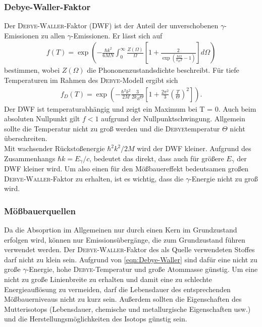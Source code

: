 \documentclass[a4paper,twoside,final]{article}
\begin{document}
\subsubsection{Debye-Waller-Faktor}
Der \textsc{Debye}-\textsc{Waller}-Faktor (DWF) ist der Anteil der unverschobenen $\gamma$-Emissionen zu allen $\gamma$-Emissionen. Er lässt sich auf
\begin{align}
f(T) = \exp\left(-\frac{\hbar k^2}{6MN}\int_{0}^{\infty} \frac{Z(\Omega)}{\Omega}\left[1+\frac{2}{\exp(\frac{\hbar\Omega}{k_B T}-1)}\right] d\Omega\right)
\end{align}
bestimmen, wobei $Z(\Omega)$ die Phononenzustandsdichte beschreibt. Für tiefe Temperaturen im Rahmen des \textsc{Debye}-Modell ergibt sich
\begin{align}\label{eqn:Debye-Waller}
f_D(T) = \exp\left(-\frac{\hbar^2k^2}{2M}\frac{3}{2k_B\Theta}\left[1+\frac{2\pi^2}{3}\left(\frac{T}{\Theta}\right)^2\right]\right).
\end{align}
Der DWF ist temperaturabhängig und zeigt ein Maximum bei T = 0. Auch beim absoluten Nullpunkt gilt $f < 1$ aufgrund der Nullpunktschwingung. Allgemein sollte die Temperatur nicht zu groß werden und die \textsc{Debye}temperatur $\Theta$ nicht überschreiten.\\
Mit wachsender Rückstoßenergie $\hbar^2k^2/2M$ wird der DWF kleiner. Aufgrund des Zusammenhangs $\hbar k = E_\gamma / c $, bedeutet das direkt, dass auch für größere $E_\gamma$ der DWF kleiner wird. Um also einen für den Mößbauereffekt bedeutsamen großen \textsc{Debye}-\textsc{Waller}-Faktor zu erhalten, ist es wichtig, dass die $\gamma$-Energie nicht zu groß wird.

\subsubsection{Mößbauerquellen}
Da die Absoprtion im Allgemeinen nur durch einen Kern im Grundzustand erfolgen wird, können nur Emissionsübergänge, die zum Grundzustand führen verwendet werden. Der \textsc{Debye}-\textsc{Waller}-Faktor des als Quelle verwendeten Stoffes darf nicht zu klein sein. Aufgrund von \eqref{eqn:Debye-Waller} sind dafür eine nicht zu große $\gamma$-Energie, hohe \textsc{Debye}-Temperatur und große Atommasse günstig. Um eine nicht zu große Linienbreite zu erhalten und damit eine zu schlechte Energieauflösung zu vermeiden, darf die Lebensdauer des entsprechenden Mößbauerniveaus nicht zu kurz sein. Außerdem sollten die Eigenschaften des Mutterisotops (Lebensdauer, chemische und metallurgische Eigenschaften usw.) und die Herstellungsmöglichkeiten des Isotops günstig sein.
\end{document}
